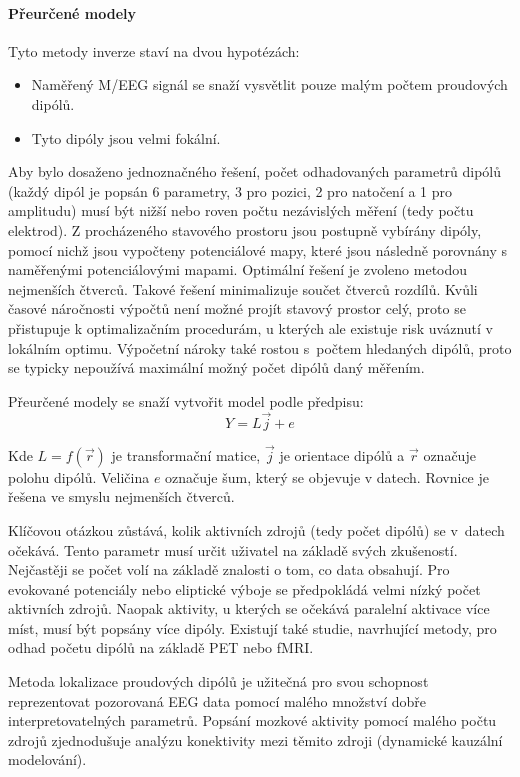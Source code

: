 \paragraph{Přeurčené modely}
Tyto metody inverze staví na dvou hypotézách: 

\begin{itemize}
\item Naměřený M/EEG signál se snaží vysvětlit pouze malým počtem proudových dipólů. 
\item Tyto dipóly jsou velmi fokální. 
\end{itemize}

Aby bylo dosaženo jednoznačného řešení, počet odhadovaných parametrů dipólů (každý dipól je popsán 6 parametry, 3 pro pozici, 2 pro natočení a 1 pro amplitudu) musí být nižší nebo roven počtu nezávislých měření (tedy počtu elektrod). Z procházeného stavového prostoru jsou postupně vybírány dipóly, pomocí nichž jsou vypočteny potenciálové mapy, které jsou následně porovnány s naměřenými potenciálovými mapami. Optimální řešení je zvoleno metodou nejmenších čtverců. Takové řešení minimalizuje součet čtverců rozdílů. Kvůli časové náročnosti výpočtů není možné projít stavový prostor celý, proto se přistupuje k optimalizačním procedurám, u kterých ale existuje risk uváznutí v lokálním optimu. Výpočetní nároky také rostou s~počtem hledaných dipólů, proto se typicky nepoužívá maximální možný počet dipólů daný měřením. \cite{28,29}

Přeurčené modely se snaží vytvořit model podle předpisu:
\begin{equation}
Y = L\vec{j} + e
\end{equation}

Kde $L=f(\vec{r})$ je transformační matice, $\vec{j}$ je orientace dipólů a $\vec{r}$ označuje polohu dipólů. Veličina $e$ označuje šum, který se objevuje v datech. Rovnice je řešena ve smyslu nejmenších čtverců. \cite{25}

Klíčovou otázkou zůstává, kolik aktivních zdrojů (tedy počet dipólů) se v~datech očekává. Tento parametr musí určit uživatel na základě svých zkušeností. Nejčastěji se počet volí na základě znalosti o tom, co data obsahují. Pro evokované potenciály nebo eliptické výboje se předpokládá velmi nízký počet aktivních zdrojů. Naopak aktivity, u kterých se očekává paralelní aktivace více míst, musí být popsány více dipóly. Existují také studie, navrhující metody, pro odhad početu dipólů na základě PET nebo fMRI. \cite{41,29}

Metoda lokalizace proudových dipólů je užitečná pro svou schopnost reprezentovat pozorovaná EEG data pomocí malého množství dobře interpretovatelných parametrů. Popsání mozkové aktivity pomocí malého počtu zdrojů zjednodušuje analýzu konektivity mezi těmito zdroji (dynamické kauzální modelování). \cite{42}

